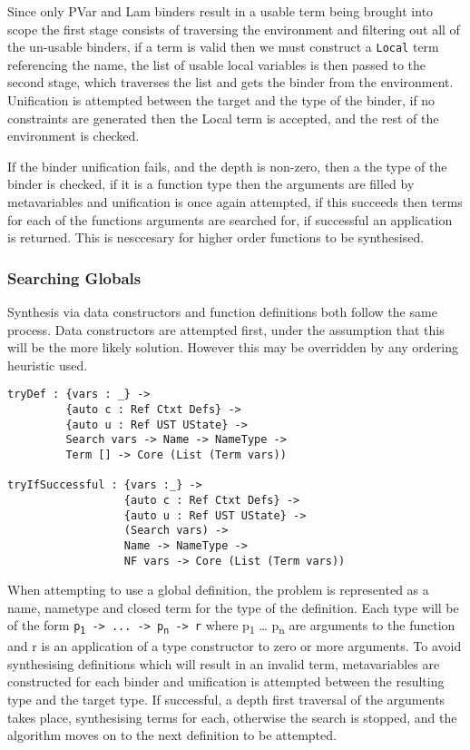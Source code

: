 \documentclass[a4paper]{article}
\begin{document}
Since only PVar and Lam binders result in a usable term being brought into scope the first stage consists of traversing
the environment and filtering out all of the un-usable binders, if a term is valid then we must construct a \texttt{Local} 
term referencing the name, the list of usable local variables is then passed to the second stage, which traverses the 
list and gets the binder from the environment. Unification is attempted between the target and the type of the binder,
if no constraints are generated then the Local term is accepted, and the rest of the environment is checked. 

If the binder unification fails, and the depth is non-zero, then a the type of the binder is checked, if it is a 
function type then the arguments are filled by metavariables and unification is once again attempted, if this 
succeeds then terms for each of the functions arguments are searched for, if successful an application is returned. This
is nesccesary for higher order functions to be synthesised.   

\subsubsection{Searching Globals}
\label{sec:org8039f5d}

Synthesis via data constructors and function definitions
both follow the same process. Data constructors are attempted
first, under the assumption that this will be the more likely solution.
However this may be overridden by any ordering heuristic used.

\begin{center}
\begin{verbatim}
tryDef : {vars : _} ->
		 {auto c : Ref Ctxt Defs} -> 
		 {auto u : Ref UST UState} ->
		 Search vars -> Name -> NameType ->
		 Term [] -> Core (List (Term vars))

tryIfSuccessful : {vars :_} ->
				  {auto c : Ref Ctxt Defs} ->
				  {auto u : Ref UST UState} ->
				  (Search vars) ->
				  Name -> NameType ->
				  NF vars -> Core (List (Term vars))
\end{verbatim}
\end{center}

When attempting to use a global definition, the problem is represented as a
name, nametype and closed term for the type of the definition. 
Each type will be of the form \texttt{p\textsubscript{1} -> ... -> p\textsubscript{n} -> r} where p\textsubscript{1} \ldots{} p\textsubscript{n} are 
arguments to the function and r is an application of a type constructor
to zero or more arguments. To avoid synthesising definitions which 
will result in an invalid term, metavariables are constructed for each binder and 
unification is attempted between the resulting type and the target type. If 
successful, a depth first traversal of the arguments takes place, synthesising terms for 
each, otherwise the search is stopped, and the algorithm
moves on to the next definition to be attempted. 
\end{document}
